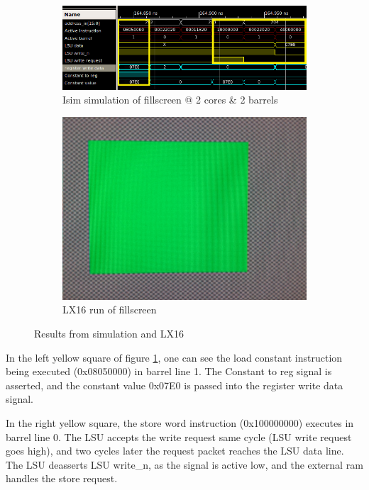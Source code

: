 \documentclass[../main/report.tex]{subfiles}
\begin{document}
\begin{figure}[H]
  \centering
  \begin{subfigure}[b]{\textwidth}
    \includegraphics[width=\textwidth]{assets/Constant_load_&_store.png}
    \caption{Isim simulation of fillscreen @ 2 cores \& 2 barrels}
    \label{fig:isim-kernel-parameterization}
  \end{subfigure}
  \begin{subfigure}[b]{0.3\textwidth}
    \includegraphics[width=\textwidth]{assets/green_screen.jpg}
    \caption{LX16 run of fillscreen}
    \label{fig:LX16-kernel-parameterization}
  \end{subfigure}
  \caption{Results from simulation and LX16}
\end{figure}

In the left yellow square of figure \ref{fig:isim-kernel-parameterization}, one can see the load constant instruction being executed (0x08050000) in barrel line 1.
The Constant to reg signal is asserted, and the constant value 0x07E0 is passed into the register write data signal.

In the right yellow square, the store word instruction (0x100000000) executes in barrel line 0.
The LSU accepts the write request same cycle (LSU write request goes high), and two cycles later the request packet reaches the LSU data line.
The LSU deasserts LSU write\_n, as the signal is active low, and the external ram handles the store request.
\end{document}

